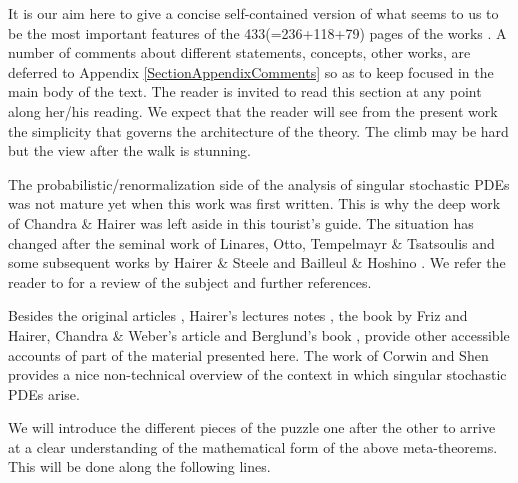 \documentclass[10pt, reqno]{amsart}
\numberwithin{subsection}{section}
\numberwithin{subsubsection}{subsection}
\numberwithin{equation}{section} %
\theoremstyle{mystyle}
\theoremstyle{mystyle2}
\theoremstyle{mystyle3}
\newcommand{\ssk}{\smallskip}
\begin{document}
\medskip

It is our aim here to give a concise self-contained version of what seems to us to be the most important features of the 433(=236+118+79) pages of the works \cite{Hai14, BHZ, BCCH18}. A number of comments about different statements, concepts, other works, are deferred to Appendix {\sf \ref{SectionAppendixComments}} so as to keep focused in the main body of the text. The reader is invited to read this section at any point along her/his reading. We expect that the reader will see from the present work the simplicity that governs the architecture of the theory. The climb may be hard but the view after the walk is stunning. 

The probabilistic/renormalization side of the analysis of singular stochastic PDEs was not mature yet when this work was first written. This is why the deep work \cite{ChandraHairer} of Chandra \& Hairer was left aside in this tourist's guide. The situation has changed after the seminal work \cite{LOTT} of Linares, Otto, Tempelmayr \& Tsatsoulis and some subsequent works by Hairer \& Steele \cite{HS} and Bailleul \& Hoshino \cite{BH23}. We refer the reader to \cite{BHReview} for a review of the subject and further references.

\ssk

Besides the original articles \cite{Hai14, BHZ, ChandraHairer, BCCH18}, Hairer's lectures notes \cite{HairerBrazil, HairerTakagi}, the book \cite{FrizHairerBook} by Friz and Hairer, Chandra \& Weber's article \cite{ChandraWeber} and Berglund's book \cite{Berglund}, provide other accessible accounts of part of the material presented here. The work \cite{CorwinShen} of Corwin and Shen provides a nice non-technical overview of the context in which singular stochastic PDEs arise.

\medskip

We will introduce the different pieces of the puzzle one after the other to arrive at a clear understanding of the mathematical form of the above meta-theorems. This will be done along the following lines. 

\ssk
\end{document}
